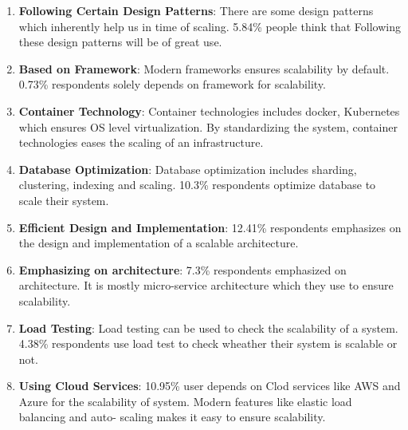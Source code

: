 \begin{enumerate}
    
    \item \textbf{Following Certain Design Patterns}: There are some design patterns which inherently help us in time of scaling. 5.84\% people think that Following these design patterns will be of great use.
    
    \item \textbf{Based on Framework}: Modern frameworks ensures scalability by default. 0.73\% respondents solely depends on framework for scalability.
    
    
    \item \textbf{Container Technology}: Container technologies includes docker, Kubernetes which ensures OS level virtualization. By standardizing the system, container technologies eases the scaling of an infrastructure.
    
    \item \textbf{Database Optimization}: Database optimization includes sharding, clustering, indexing and scaling. 10.3\% respondents optimize database to scale their system.
    
    \item \textbf{Efficient Design and Implementation}: 12.41\% respondents emphasizes on  the design and implementation of a scalable architecture.
    
    \item \textbf{Emphasizing on architecture}: 7.3\% respondents emphasized on architecture. It is mostly micro-service architecture which they use to ensure scalability.
    
    \item \textbf{Load Testing}: Load testing can be used to check the scalability of a system. 4.38\% respondents use load test to check wheather their system is scalable or not.
    
    \item \textbf{Using Cloud Services}: 10.95\% user depends on Clod services like AWS and Azure  for the scalability of system. Modern features like elastic load balancing and  auto- scaling makes it easy to ensure scalability.
    
    
    
\end{enumerate}
